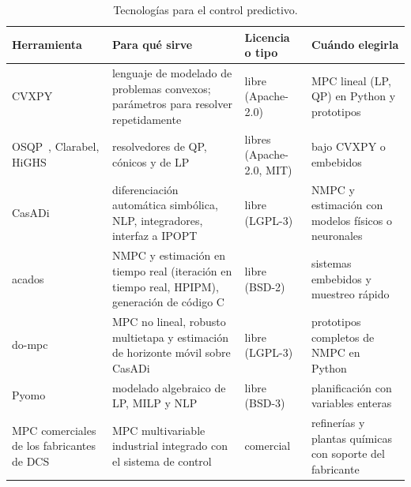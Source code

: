\begin{table}[htbp]
\centering\footnotesize
\begin{tabularx}{\textwidth}{@{}>{\raggedright\arraybackslash}p{3.1cm}>{\raggedright\arraybackslash}X>{\raggedright\arraybackslash}p{2.0cm}>{\raggedright\arraybackslash}X@{}}
\toprule
Herramienta & Para qué sirve & Licencia o tipo & Cuándo elegirla \\
\midrule
CVXPY~\cite{cvxpy} & lenguaje de modelado de problemas convexos; parámetros para resolver repetidamente & libre (Apache-2.0) & MPC lineal (LP, QP) en Python y prototipos \\
OSQP~\cite{osqp}, Clarabel, HiGHS & resolvedores de QP, cónicos y de LP & libres (Apache-2.0, MIT) & bajo CVXPY o embebidos \\
CasADi~\cite{casadi} & diferenciación automática simbólica, NLP, integradores, interfaz a IPOPT & libre (LGPL-3) & NMPC y estimación con modelos físicos o neuronales \\
acados~\cite{acados} & NMPC y estimación en tiempo real (iteración en tiempo real, HPIPM), generación de código C & libre (BSD-2) & sistemas embebidos y muestreo rápido \\
do-mpc~\cite{dompc} & MPC no lineal, robusto multietapa y estimación de horizonte móvil sobre CasADi & libre (LGPL-3) & prototipos completos de NMPC en Python \\
Pyomo & modelado algebraico de LP, MILP y NLP & libre (BSD-3) & planificación con variables enteras \\
MPC comerciales de los fabricantes de DCS & MPC multivariable industrial integrado con el sistema de control & comercial & refinerías y plantas químicas con soporte del fabricante \\
\bottomrule
\end{tabularx}
\caption{Tecnologías para el control predictivo.}
\label{tab:tec3}
\end{table}

\addtocounter{definicion}{1}%

